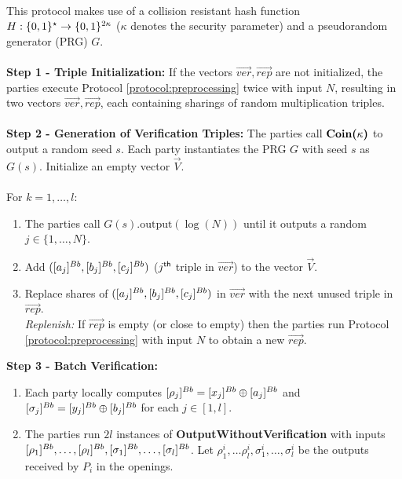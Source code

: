 \begin{protocol}
    \label{protocol:batch_trip_without_open}
    \\
    This protocol makes use of a collision resistant hash function $H: \{0, 1\}^{\star} \rightarrow \{0, 1\}^{2 \kappa}$ ($\kappa$ denotes the security parameter) and a pseudorandom generator (PRG) $G$.\\~\\
    {\bf Step 1 - Triple Initialization:} If the vectors $\vec{ver}, \vec{rep}$ are not initialized, the parties execute Protocol \ref{protocol:preprocessing} twice with input $N$, resulting in two vectors $\vec{ver}, \vec{rep}$, each containing sharings of random multiplication triples.\\~\\
    {\bf Step 2 - Generation of Verification Triples:} The parties call $\textbf{Coin(}\kappa\textbf{)}$ to output a random seed $s$.
    Each party instantiates the PRG $G$ with seed $s$ as $G(s)$.
    Initialize an empty vector $\vec{V}$.\\~\\
    For $k = 1, \ldots, l$:
    \begin{enumerate}
        \item The parties call $G(s).\mbox{output}(\log (N))$ until it outputs a random $j \in \{1, \ldots, N\}$.
        \item Add $([a_j]^{Bb}, [b_j]^{Bb}, [c_j]^{Bb})$ ($j^{\sf th}$ triple in $\vec{ver}$) to the vector $\vec{V}$.
        \item Replace shares of $([a_j]^{Bb}, [b_j]^{Bb}, [c_j]^{Bb})$ in $\vec{ver}$ with the next unused triple in $\vec{rep}$.\\
        {\it Replenish:} If $\vec{rep}$ is empty (or close to empty) then the parties run Protocol \ref{protocol:preprocessing} with input $N$ to obtain a new $\vec{rep}$.
    \end{enumerate}
    {\bf Step 3 - Batch Verification:}
    \begin{enumerate} 
        \item Each party locally computes $[\rho_j]^{Bb} = [x_j]^{Bb} \oplus [a_j]^{Bb}$ and $[\sigma_j]^{Bb} = [y_j]^{Bb} \oplus [b_j]^{Bb}$ for each $j \in [1, l]$.
        \item The parties run $2l$ instances of {\bf OutputWithoutVerification} with inputs $[\rho_1]^{Bb}, \ldots, [\rho_l]^{Bb}, [\sigma_1]^{Bb}, \ldots, [\sigma_l]^{Bb}$.
        Let $\rho^i_1, \ldots \rho^i_l, \sigma^i_1, \ldots, \sigma^i_l$ be the outputs received by $P_i$ in the openings.

\end{enumerate}
\end{protocol}
